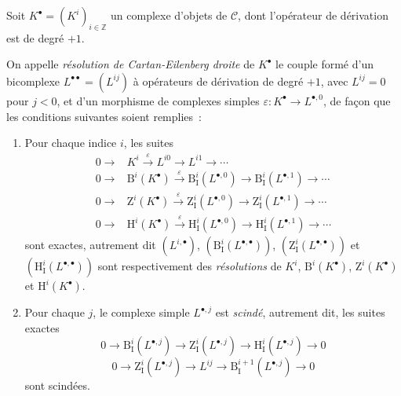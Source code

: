 \begin{env}[11.4.2]
\label{0.11.4.2-fr}
Soit $K^\bullet=(K^i)_{i\in\mathbb Z}$ un complexe d'objets de $\mathcal C$,
dont l'opérateur de dérivation est de degré $+1$.

On appelle \emph{résolution de Cartan-Eilenberg droite} de $K^\bullet$ le
couple formé d'un bicomplexe $L^{\bullet\bullet}=(L^{ij})$ à opérateurs de
dérivation de degré $+1$, avec $L^{ij}=0$ pour $j<0$, et d'un morphisme de
complexes simples $\varepsilon:K^\bullet\to L^{\bullet,0}$, de façon que les
conditions suivantes soient remplies~:
\begin{enumerate}
  \item[(i)] Pour chaque indice $i$, les suites
    \[
    \begin{aligned}
      0\longrightarrow{}&K^i\xrightarrow{\varepsilon}L^{i0}
        \longrightarrow L^{i1}\longrightarrow\cdots\\
      0\longrightarrow{}&\mathrm B^i(K^\bullet)\xrightarrow{\varepsilon}
        \mathrm B_{\mathrm I}^i(L^{\bullet,0})
        \longrightarrow\mathrm B_{\mathrm I}^i(L^{\bullet,1})
        \longrightarrow\cdots\\
      0\longrightarrow{}&\mathrm Z^i(K^\bullet)\xrightarrow{\varepsilon}
        \mathrm Z_{\mathrm I}^i(L^{\bullet,0})
        \longrightarrow\mathrm Z_{\mathrm I}^i(L^{\bullet,1})
        \longrightarrow\cdots\\
      0\longrightarrow{}&\mathrm H^i(K^\bullet)\xrightarrow{\varepsilon}
        \mathrm H_{\mathrm I}^i(L^{\bullet,0})
        \longrightarrow\mathrm H_{\mathrm I}^i(L^{\bullet,1})
        \longrightarrow\cdots
    \end{aligned}
    \]
    sont exactes, autrement dit $(L^{i,\bullet})$,
    $(\mathrm B_{\mathrm I}^i(L^{\bullet,\bullet}))$,
    $(\mathrm Z_{\mathrm I}^i(L^{\bullet,\bullet}))$ et
    $(\mathrm H_{\mathrm I}^i(L^{\bullet,\bullet}))$ sont respectivement
    des \emph{résolutions} de $K^i$, $\mathrm B^i(K^\bullet)$,
    $\mathrm Z^i(K^\bullet)$ et $\mathrm H^i(K^\bullet)$.
  \item[(ii)] Pour chaque $j$, le complexe simple $L^{\bullet,j}$ est
    \emph{scindé}, autrement dit, les suites exactes
    \[
      \label{0.11.4.2.1-fr}
      0\longrightarrow\mathrm B_{\mathrm I}^i(L^{\bullet,j})
      \longrightarrow\mathrm Z_{\mathrm I}^i(L^{\bullet,j})
      \longrightarrow\mathrm H_{\mathrm I}^i(L^{\bullet,j})
      \longrightarrow0
      \tag{11.4.2.1}
    \]
    \[
      \label{0.11.4.2.2-fr}
      0\longrightarrow\mathrm Z_{\mathrm I}^i(L^{\bullet,j})
      \longrightarrow L^{ij}
      \longrightarrow\mathrm B_{\mathrm I}^{i+1}(L^{\bullet,j})
      \longrightarrow0
      \tag{11.4.2.2}
    \]
    sont scindées.
\end{enumerate}


\end{env}
